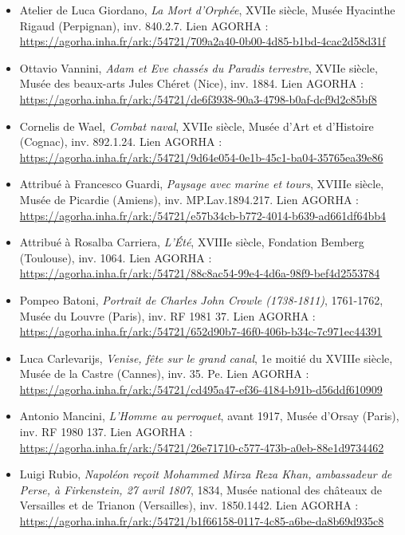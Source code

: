 \begin{itemize}
    \item Atelier de Luca Giordano, \textit{La Mort d'Orphée}, XVIIe siècle, Musée Hyacinthe Rigaud (Perpignan), inv. 840.2.7. Lien AGORHA : \\ \url{https://agorha.inha.fr/ark:/54721/709a2a40-0b00-4d85-b1bd-4cac2d58d31f}
    \item Ottavio Vannini, \textit{Adam et Eve chassés du Paradis terrestre}, XVIIe siècle, Musée des beaux-arts Jules Chéret (Nice), inv. 1884. Lien AGORHA : \\ \url{https://agorha.inha.fr/ark:/54721/de6f3938-90a3-4798-b0af-dcf9d2c85bf8}
    \item Cornelis de Wael, \textit{Combat naval}, XVIIe siècle, Musée d'Art et d'Histoire (Cognac), inv. 892.1.24. Lien AGORHA : \\ \url{https://agorha.inha.fr/ark:/54721/9d64e054-0e1b-45c1-ba04-35765ea39e86}
    \item Attribué à Francesco Guardi, \textit{Paysage avec marine et tours}, XVIIIe siècle, Musée de Picardie (Amiens), inv. MP.Lav.1894.217. Lien AGORHA : \\ \url{https://agorha.inha.fr/ark:/54721/e57b34cb-b772-4014-b639-ad661df64bb4}
    \item Attribué à Rosalba Carriera, \textit{L'Été}, XVIIIe siècle, Fondation Bemberg (Toulouse), inv. 1064. Lien AGORHA : \\ \url{https://agorha.inha.fr/ark:/54721/88c8ac54-99e4-4d6a-98f9-bef4d2553784}
    \item Pompeo Batoni, \textit{Portrait de Charles John Crowle (1738-1811)}, 1761-1762, Musée du Louvre (Paris), inv. RF 1981 37. Lien AGORHA : \\ \url{https://agorha.inha.fr/ark:/54721/652d90b7-46f0-406b-b34c-7c971ec44391}
    \item Luca Carlevarijs, \textit{Venise, fête sur le grand canal}, 1e moitié du XVIIIe siècle, Musée de la Castre (Cannes), inv. 35. Pe. Lien AGORHA : \\ \url{https://agorha.inha.fr/ark:/54721/cd495a47-ef36-4184-b91b-d56ddf610909}
    \item Antonio Mancini, \textit{L'Homme au perroquet}, avant 1917, Musée d'Orsay (Paris), inv. RF 1980 137. Lien AGORHA : \\ \url{https://agorha.inha.fr/ark:/54721/26e71710-c577-473b-a0eb-88e1d9734462}
    \item Luigi Rubio, \textit{Napoléon reçoit Mohammed Mirza Reza Khan, ambassadeur de Perse, à Firkenstein, 27 avril 1807}, 1834, Musée national des châteaux de Versailles et de Trianon (Versailles), inv. 1850.1442. Lien AGORHA : \\ \url{https://agorha.inha.fr/ark:/54721/b1f66158-0117-4c85-a6be-da8b69d935c8}

\end{itemize}
